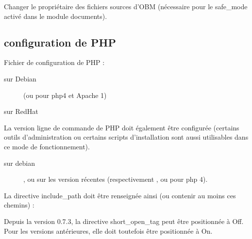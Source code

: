 Changer le propriétaire des fichiers sources d'OBM (nécessaire pour le
safe\_mode activé dans le module documents). 


\subsection{configuration de PHP}

Fichier de configuration de PHP : 

\begin{description}
\item[sur Debian]  (ou  pour php4 et Apache 1)
\item[sur RedHat] 
\end{description}

La version ligne de commande de PHP doit également être configurée
(certains outils d'administration ou certains scripts d'installation
sont aussi utilisables dans ce mode de fonctionnement).

\begin{description}
\item[sur debian] , ou 
 sur les version récentes (respectivement , ou  pour php 4).
\end{description}


La directive include\_path doit être renseignée ainsi (ou contenir au moins ces chemins) : 


Depuis la version 0.7.3, la directive short\_open\_tag peut être
positionnée à Off. Pour les versions antérieures, elle doit toutefois
être positionnée à On.



